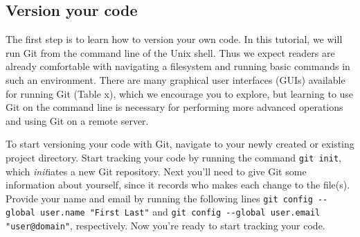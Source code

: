 \subsection{Version your code}

The first step is to learn how to version your own code. In this tutorial, we will run Git from the command line of the Unix shell. Thus we expect readers are already comfortable with navigating a filesystem and running basic commands in such an environment. There are many graphical user interfaces (GUIs) available for running Git (Table x), which we encourage you to explore, but learning to use Git on the command line is necessary for performing more advanced operations and using Git on a remote server.

To start versioning your code with Git, navigate to your newly created or existing project directory. Start tracking your code by running the command \verb|git init|, which \textit{init}iates a new Git repository. Next you'll need to give Git some information about yourself, since it records who makes each change to the file(s). Provide your name and email by running the following lines \verb|git config --global user.name "First Last"| and \verb|git config --global user.email "user@domain"|, respectively. Now you're ready to start tracking your code.

